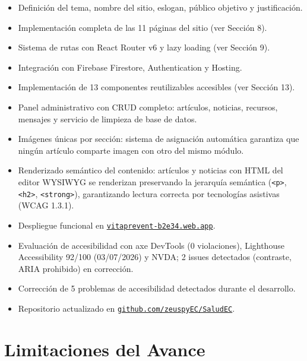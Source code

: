 \documentclass[12pt, a4paper]{article}
\begin{document}
\begin{itemize}
  \item Definición del tema, nombre del sitio, eslogan, público objetivo y justificación.
  \item Implementación completa de las 11 páginas del sitio (ver Sección 8).
  \item Sistema de rutas con React Router v6 y lazy loading (ver Sección 9).
  \item Integración con Firebase Firestore, Authentication y Hosting.
  \item Implementación de 13 componentes reutilizables accesibles (ver Sección 13).
  \item Panel administrativo con CRUD completo: artículos, noticias, recursos, mensajes y servicio de limpieza de base de datos.
  \item Imágenes únicas por sección: sistema de asignación automática garantiza que ningún artículo comparte imagen con otro del mismo módulo.
  \item Renderizado semántico del contenido: artículos y noticias con HTML del editor WYSIWYG se renderizan preservando la jerarquía semántica (\texttt{<p>}, \texttt{<h2>}, \texttt{<strong>}), garantizando lectura correcta por tecnologías asistivas (WCAG 1.3.1).
  \item Despliegue funcional en \href{https://vitaprevent-b2e34.web.app}{\texttt{vitaprevent-b2e34.web.app}}.
  \item Evaluación de accesibilidad con axe DevTools (0 violaciones), Lighthouse Accessibility 92/100 (03/07/2026) y NVDA; 2 issues detectados (contraste, ARIA prohibido) en corrección.
  \item Corrección de 5 problemas de accesibilidad detectados durante el desarrollo.
  \item Repositorio actualizado en \href{https://github.com/zeuspyEC/SaludEC}{\texttt{github.com/zeuspyEC/SaludEC}}.
\end{itemize}

\section{Limitaciones del Avance}
\end{document}
